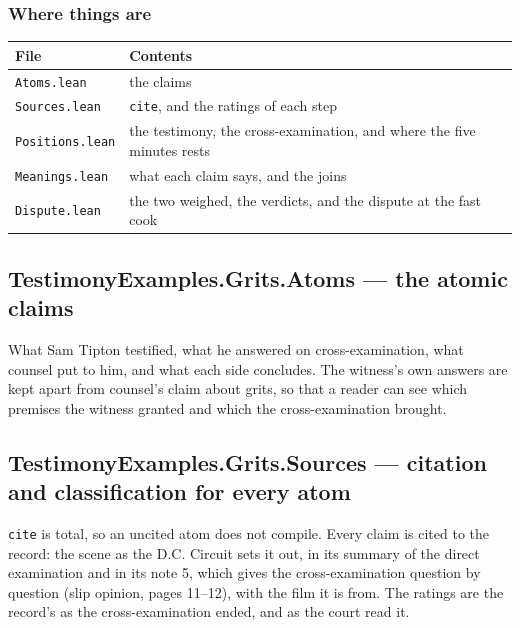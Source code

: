 \documentclass[11pt]{article}
\begin{document}
\subsubsection*{Where things are}
\begin{longtable}{@{}>{\raggedright\arraybackslash}p{} >{\raggedright\arraybackslash}p{}@{}}
\toprule
\textbf{File} & \textbf{Contents} \\
\midrule
\endhead
\texttt{Atoms.lean} & the claims \\
\texttt{Sources.lean} & \texttt{cite}, and the ratings of each step \\
\texttt{Positions.lean} & the testimony, the cross-examination, and where the five minutes rests \\
\texttt{Meanings.lean} & what each claim says, and the joins \\
\texttt{Dispute.lean} & the two weighed, the verdicts, and the dispute at the fast cook \\
\bottomrule
\end{longtable}
\subsection*{TestimonyExamples.Grits.Atoms — the atomic claims}
What Sam Tipton testified, what he answered on cross-examination, what counsel put to him, and what each side concludes. The witness’s own answers are kept apart from counsel’s claim about grits, so that a reader can see which premises the witness granted and which the cross-examination brought.

\subsection*{TestimonyExamples.Grits.Sources — citation and classification for every atom}
\texttt{cite} is total, so an uncited atom does not compile. Every claim is cited to the record: the scene as the D.C. Circuit sets it out, in its summary of the direct examination and in its note 5, which gives the cross-examination question by question (slip opinion, pages 11–12), with the film it is from. The ratings are the record’s as the cross-examination ended, and as the court read it.
\end{document}
